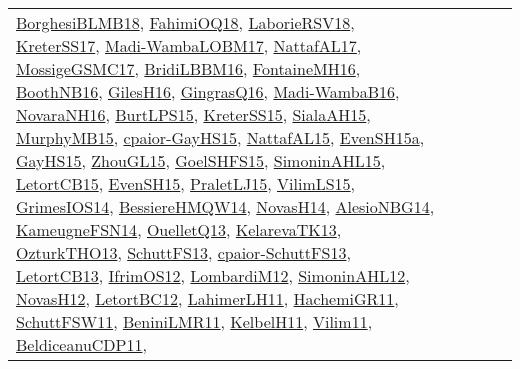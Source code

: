 {\begin{longtable}{lp{3cm}>{\raggedright}p{6cm}>{\raggedright}p{6cm}p{8cm}}
\href{articles/BorghesiBLMB18.pdf}{BorghesiBLMB18}\cite{BorghesiBLMB18}, \href{articles/FahimiOQ18.pdf}{FahimiOQ18}\cite{FahimiOQ18}, \href{articles/LaborieRSV18.pdf}{LaborieRSV18}\cite{LaborieRSV18}, \href{articles/KreterSS17.pdf}{KreterSS17}\cite{KreterSS17}, \href{papers/Madi-WambaLOBM17.pdf}{Madi-WambaLOBM17}\cite{Madi-WambaLOBM17}, \href{articles/NattafAL17.pdf}{NattafAL17}\cite{NattafAL17}, \href{papers/MossigeGSMC17.pdf}{MossigeGSMC17}\cite{MossigeGSMC17}, \href{papers/BridiLBBM16.pdf}{BridiLBBM16}\cite{BridiLBBM16}, \href{papers/FontaineMH16.pdf}{FontaineMH16}\cite{FontaineMH16}, \href{papers/BoothNB16.pdf}{BoothNB16}\cite{BoothNB16}, \href{papers/GilesH16.pdf}{GilesH16}\cite{GilesH16}, \href{papers/GingrasQ16.pdf}{GingrasQ16}\cite{GingrasQ16}, \href{papers/Madi-WambaB16.pdf}{Madi-WambaB16}\cite{Madi-WambaB16}, \href{articles/NovaraNH16.pdf}{NovaraNH16}\cite{NovaraNH16}, \href{papers/BurtLPS15.pdf}{BurtLPS15}\cite{BurtLPS15}, \href{papers/KreterSS15.pdf}{KreterSS15}\cite{KreterSS15}, \href{papers/SialaAH15.pdf}{SialaAH15}\cite{SialaAH15}, \href{papers/MurphyMB15.pdf}{MurphyMB15}\cite{MurphyMB15}, \href{papers/cpaior-GayHS15.pdf}{cpaior-GayHS15}\cite{cpaior-GayHS15}, \href{articles/NattafAL15.pdf}{NattafAL15}\cite{NattafAL15}, \href{articles/EvenSH15a.pdf}{EvenSH15a}\cite{EvenSH15a}, \href{papers/GayHS15.pdf}{GayHS15}\cite{GayHS15}, \href{papers/ZhouGL15.pdf}{ZhouGL15}\cite{ZhouGL15}, \href{articles/GoelSHFS15.pdf}{GoelSHFS15}\cite{GoelSHFS15}, \href{articles/SimoninAHL15.pdf}{SimoninAHL15}\cite{SimoninAHL15}, \href{articles/LetortCB15.pdf}{LetortCB15}\cite{LetortCB15}, \href{papers/EvenSH15.pdf}{EvenSH15}\cite{EvenSH15}, \href{papers/PraletLJ15.pdf}{PraletLJ15}\cite{PraletLJ15}, \href{papers/VilimLS15.pdf}{VilimLS15}\cite{VilimLS15}, \href{articles/GrimesIOS14.pdf}{GrimesIOS14}\cite{GrimesIOS14}, \href{papers/BessiereHMQW14.pdf}{BessiereHMQW14}\cite{BessiereHMQW14}, \href{articles/NovasH14.pdf}{NovasH14}\cite{NovasH14}, \href{papers/AlesioNBG14.pdf}{AlesioNBG14}\cite{AlesioNBG14}, \href{articles/KameugneFSN14.pdf}{KameugneFSN14}\cite{KameugneFSN14}, \href{papers/OuelletQ13.pdf}{OuelletQ13}\cite{OuelletQ13}, \href{papers/KelarevaTK13.pdf}{KelarevaTK13}\cite{KelarevaTK13}, \href{articles/OzturkTHO13.pdf}{OzturkTHO13}\cite{OzturkTHO13}, \href{papers/SchuttFS13.pdf}{SchuttFS13}\cite{SchuttFS13}, \href{papers/cpaior-SchuttFS13.pdf}{cpaior-SchuttFS13}\cite{cpaior-SchuttFS13}, \href{papers/LetortCB13.pdf}{LetortCB13}\cite{LetortCB13}, \href{papers/IfrimOS12.pdf}{IfrimOS12}\cite{IfrimOS12}, \href{articles/LombardiM12.pdf}{LombardiM12}\cite{LombardiM12}, \href{papers/SimoninAHL12.pdf}{SimoninAHL12}\cite{SimoninAHL12}, \href{articles/NovasH12.pdf}{NovasH12}\cite{NovasH12}, \href{papers/LetortBC12.pdf}{LetortBC12}\cite{LetortBC12}, \href{papers/LahimerLH11.pdf}{LahimerLH11}\cite{LahimerLH11}, \href{articles/HachemiGR11.pdf}{HachemiGR11}\cite{HachemiGR11}, \href{articles/SchuttFSW11.pdf}{SchuttFSW11}\cite{SchuttFSW11}, \href{articles/BeniniLMR11.pdf}{BeniniLMR11}\cite{BeniniLMR11}, \href{articles/KelbelH11.pdf}{KelbelH11}\cite{KelbelH11}, \href{papers/Vilim11.pdf}{Vilim11}\cite{Vilim11}, \href{articles/BeldiceanuCDP11.pdf}{BeldiceanuCDP11}\cite{BeldiceanuCDP11}, 
\end{longtable}}
